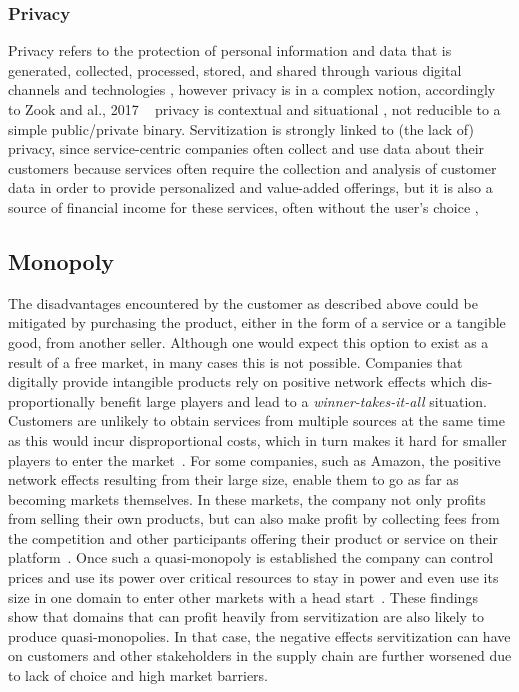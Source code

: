 \documentclass[sigplan,screen,nonacm]{acmart}
\begin{document}
\subsubsection{Privacy}
Privacy refers to the protection of personal information and data that is generated, collected, processed, stored, and shared through various digital channels and technologies \cite{solove2008understanding}, however privacy is in a complex notion, accordingly to Zook and al., 2017 ~\cite{zook2017ten} privacy is contextual \cite{nissenbaum2009privacy} and situational \cite{marwick2014networked}, not reducible to a simple public/private binary. Servitization is strongly linked to (the lack of) privacy, since service-centric companies often collect and use data about their customers because services often require the collection and analysis of customer data in order to provide personalized and value-added offerings, but it is also a source of financial income for these services, often without the user's choice \cite{ritter2020digitization,albrechtslund2020amazon}, 




\subsection{Monopoly}
\label{sec:monopoly}
The disadvantages encountered by the customer as described above could be mitigated by purchasing the product, either in the form of a service or a tangible good, from another seller. Although one would expect this option to exist as a result of a free market, in many cases this is not possible. Companies that digitally provide intangible products rely on positive network effects which dis-proportionally benefit large players and lead to a \textit{winner-takes-it-all} situation\cite{gebauer2021digital}. Customers are unlikely to obtain services from multiple sources at the same time as this would incur disproportional costs, which in turn makes it hard for smaller players to enter the market~\cite{Eisenmann2011Platformenvelopment}. For some companies, such as Amazon, the positive network effects resulting from their large size, enable them to go as far as  becoming markets themselves. In these markets, the company not only profits from selling their own products, but can also make profit by collecting fees from the competition and other participants offering their product or service on their platform~\cite{kreutzmann2022case}. Once such a quasi-monopoly is established the company can control prices and use its power over critical resources to stay in power and even use its size in one domain to enter other markets with a head start~\cite{Eisenmann2011Platformenvelopment}. These findings show that domains that can profit heavily from servitization are also likely to produce quasi-monopolies. In that case, the negative effects servitization can have on customers and other stakeholders in the supply chain are further worsened due to lack of choice and high market barriers.
\end{document}
